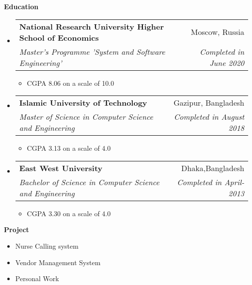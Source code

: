 \documentclass[letterpaper,10pt]{article}
\makeatletter
\newcommand{\resitem}[1]{\item #1 \vspace{-2pt}}
\newcommand{\resheading}[1]{{\large \colorbox{mygrey}{\begin{minipage}{\textwidth}{\textbf{#1 \vphantom{p\^{E}}}}\end{minipage}}}}
\newcommand{\ressubheading}[4]{
\begin{tabular*}{6.5in}{l@{\extracolsep{\fill}}r}
		\textbf{#1} & #2 \\
		\textit{#3} & \textit{#4} \\
\end{tabular*}\vspace{-6pt}}
\makeatother
\begin{document}
\resheading{Education}
\begin{itemize}
\item
	\ressubheading{National Research University Higher School of Economics}{Moscow, Russia}{Master’s Programme 'System and Software Engineering'}{Completed in June 2020}
	\begin{itemize}

		\item  CGPA 8.06 on a scale of 10.0

	\end{itemize}


\item
	\ressubheading{Islamic University of Technology}{Gazipur, Bangladesh}{Master of Science in Computer Science and Engineering }{Completed in August 2018}
\begin{itemize}

		\item  CGPA 3.13  on a scale of 4.0

	\end{itemize}
	
\item
	\ressubheading{East West University}{Dhaka,Bangladesh}{Bachelor of Science in Computer Science and Engineering}{Completed in April-2013}
	\begin{itemize}
		\item  CGPA 3.30 on a scale of 4.0

	\end{itemize}


\end{itemize}

\resheading{Project}

\begin{itemize}
\resitem{Nurse Calling system}
\resitem{Vendor Management System}
\resitem{Personal Work}
\end{itemize}
\end{document}
